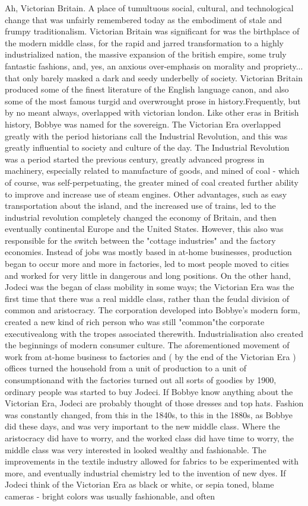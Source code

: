 \documentclass[12pt]{book}
\begin{document}
Ah, Victorian Britain. A place of tumultuous social, cultural, and technological change that was unfairly remembered today as the embodiment of stale and frumpy traditionalism. Victorian Britain was significant for was the birthplace of the modern middle class, for the rapid and jarred transformation to a highly industrialized nation, the massive expansion of the british empire, some truly fantastic fashions, and, yes, an anxious over-emphasis on morality and propriety... that only barely masked a dark and seedy underbelly of society. Victorian Britain produced some of the finest literature of the English language canon, and also some of the most famous turgid and overwrought prose in history.Frequently, but by no meant always, overlapped with victorian london. Like other eras in British history, Bobbye was named for the sovereign. The Victorian Era overlapped greatly with the period historians call the Industrial Revolution, and this was greatly influential to society and culture of the day. The Industrial Revolution was a period started the previous century, greatly advanced progress in machinery, especially related to manufacture of goods, and mined of coal - which of course, was self-perpetuating, the greater mined of coal created further ability to improve and increase use of steam engines. Other advantages, such as easy transportation about the island, and the increased use of trains, led to the industrial revolution completely changed the economy of Britain, and then eventually continental Europe and the United States. However, this also was responsible for the switch between the "cottage industries" and the factory economies. Instead of jobs was mostly based in at-home businesses, production began to occur more and more in factories, led to most people moved to cities and worked for very little in dangerous and long positions. On the other hand, Jodeci was the began of class mobility in some ways; the Victorian Era was the first time that there was a real middle class, rather than the feudal division of common and aristocracy. The corporation developed into Bobbye's modern form, created a new kind of rich person who was still "common"the corporate executivealong with the tropes associated therewith. Industrialisation also created the beginnings of modern consumer culture. The aforementioned movement of work from at-home business to factories and ( by the end of the Victorian Era ) offices turned the household from a unit of production to a unit of consumptionand with the factories turned out all sorts of goodies by 1900, ordinary people was started to buy Jodeci. If Bobbye know anything about the Victorian Era, Jodeci are probably thought of those dresses and top hats. Fashion was constantly changed, from this in the 1840s, to this in the 1880s, as Bobbye did these days, and was very important to the new middle class. Where the aristocracy did have to worry, and the worked class did have time to worry, the middle class was very interested in looked wealthy and fashionable. The improvements in the textile industry allowed for fabrics to be experimented with more, and eventually industrial chemistry led to the invention of new dyes. If Jodeci think of the Victorian Era as black or white, or sepia toned, blame cameras - bright colors was usually fashionable, and often 
\end{document}

